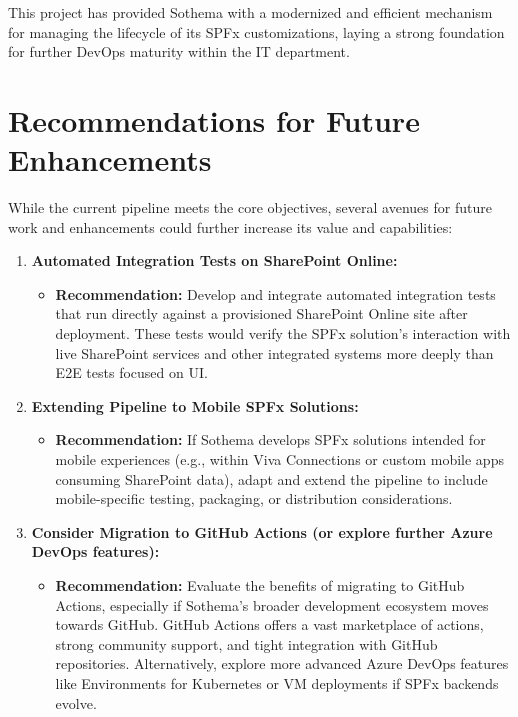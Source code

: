 This project has provided Sothema with a modernized and efficient mechanism for managing the lifecycle of its SPFx customizations, laying a strong foundation for further DevOps maturity within the IT department.

\section{Recommendations for Future Enhancements}
\label{sec:RecommendationsFutureEnhancements}

While the current pipeline meets the core objectives, several avenues for future work and enhancements could further increase its value and capabilities:

\begin{enumerate}
    \item \textbf{Automated Integration Tests on SharePoint Online:}
    \begin{itemize}
        \item \textbf{Recommendation:} Develop and integrate automated integration tests that run directly against a provisioned SharePoint Online site after deployment. These tests would verify the SPFx solution's interaction with live SharePoint services and other integrated systems more deeply than E2E tests focused on UI.
    \end{itemize}
    \item \textbf{Extending Pipeline to Mobile SPFx Solutions:}
    \begin{itemize}
        \item \textbf{Recommendation:} If Sothema develops SPFx solutions intended for mobile experiences (e.g., within Viva Connections or custom mobile apps consuming SharePoint data), adapt and extend the pipeline to include mobile-specific testing, packaging, or distribution considerations.
    \end{itemize}
    \item \textbf{Consider Migration to GitHub Actions (or explore further Azure DevOps features):}
    \begin{itemize}
        \item \textbf{Recommendation:} Evaluate the benefits of migrating to GitHub Actions, especially if Sothema's broader development ecosystem moves towards GitHub. GitHub Actions offers a vast marketplace of actions, strong community support, and tight integration with GitHub repositories. Alternatively, explore more advanced Azure DevOps features like Environments for Kubernetes or VM deployments if SPFx backends evolve.

\end{itemize}
\end{enumerate}

